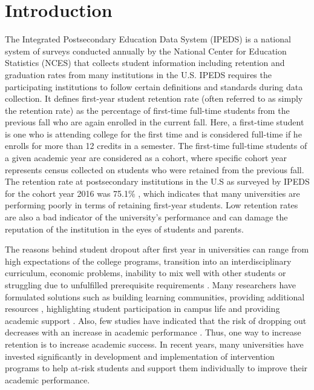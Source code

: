 \documentclass[11pt,openright]{report}
\begin{document}
\chapter{Introduction}\label{chapter:introduction} 
The Integrated Postsecondary Education Data System (IPEDS) is a national system of surveys conducted annually by the National Center for Education Statistics (NCES) that collects student information including retention and graduation rates from many institutions in the U.S. IPEDS requires the participating institutions to follow certain definitions and standards during data collection. It defines first-year student retention rate (often referred to as simply the retention rate) as the percentage of first-time full-time students from the previous fall who are again enrolled in the current fall. Here, a first-time student is one who is attending college for the first time and is considered full-time if he enrolls for more than 12 credits in a semester. The first-time full-time students of a given academic year are considered as a cohort, where specific cohort year represents census collected on students who were retained from the previous fall. The retention rate at postsecondary institutions in the U.S as surveyed by IPEDS for the cohort year 2016 was 75.1\% \cite{IPEDSRetentionRate}, which indicates that many universities are performing poorly in terms of retaining first-year students. Low retention rates are also a bad indicator of the university's performance and can damage the reputation of the institution in the eyes of students and parents. 

The reasons behind student dropout after first year in universities can range from high expectations of the college programs, transition into an interdisciplinary curriculum, economic problems, inability to mix well with other students or struggling due to unfulfilled prerequisite requirements \cite{lau2003institutional}. Many researchers have formulated solutions such as building learning communities, providing additional resources \cite{tinto1999taking}, highlighting student participation in campus life and providing academic support \cite{lau2003institutional}. Also, few studies have indicated that the risk of dropping out decreases with an increase in academic performance \cite{Murtaugh}. Thus, one way to increase retention is to increase academic success. In recent years, many universities have invested significantly in development and implementation of intervention programs to help at-risk students and support them individually to improve their academic performance. 
\end{document}
